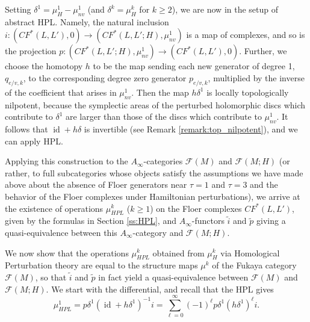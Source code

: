 \documentclass[11pt,leqno]{amsart}
\numberwithin{equation}{section}
\newcommand{\cF}{{\mathcal F}}
\newcommand{\id}{\operatorname{id}}
\begin{document}
Setting $\delta^1=\mu^1_H-\mu^1_{nv}$ (and $\delta^k=\mu^k_H$ for $k\geq 2$), we are
now in the setup of abstract HPL. Namely, the natural inclusion 
$i:(CF^*(L,L'),0)\to (CF^*(L,L';H),\mu^1_{nv})$ is a map of complexes, and so is the 
projection $p:(CF^*(L,L';H),\mu^1_{nv})\to (CF^*(L,L'),0).$ 
Further, we choose the homotopy $h$ to be the map sending each new generator
of degree 1, $q_{e/v,k}$, to the corresponding degree zero generator
$p_{e/v,k}$, multiplied by the inverse of the coefficient that
arises in $\mu^1_{nv}$. 
Then the map $h\delta^1$ is locally topologically nilpotent, because the
symplectic areas of the
perturbed holomorphic discs which contribute to $\delta^1$ are larger than
those of the discs which contribute to $\mu^1_{nv}$. It follows that
$\id+h\delta$ is invertible (see Remark \ref{remark:top_nilpotent}), and we can apply HPL.

Applying this construction to the $A_\infty$-categories $\cF(M)$ and $\cF(M;H)$ (or rather,
to full subcategories whose objects satisfy the assumptions we have made above about the
absence of Floer generators near $\tau=1$ and $\tau=3$ and the behavior
of the Floer complexes under Hamiltonian perturbations), we arrive at the
existence of operations $\mu^k_{HPL}$ ($k\geq 1$) on the Floer complexes
$CF^*(L,L')$, given by the formulas in Section \ref{ss:HPL},
and $A_\infty$-functors $\tilde{i}$ and $\tilde{p}$ giving a
quasi-equivalence between this $A_\infty$-category and $\cF(M;H)$. 
\medskip

We now show that the operations $\mu^k_{HPL}$ obtained from
$\mu^k_H$ via Homological Perturbation theory are equal to the structure
maps $\mu^k$ of the Fukaya category $\cF(M)$, so that $\tilde{i}$ and
$\tilde{p}$ in fact yield a quasi-equivalence between $\cF(M)$ and $\cF(M;H)$.
We start with the differential, and recall that the HPL gives
\begin{equation}\label{eq:mu1_HPL}
\mu^1_{HPL}=p\delta^1(\id+h\delta^1)^{-1}i=\sum_{\ell=0}^\infty
(-1)^\ell p\delta^1(h\delta^1)^\ell i.
\end{equation}
\end{document}
